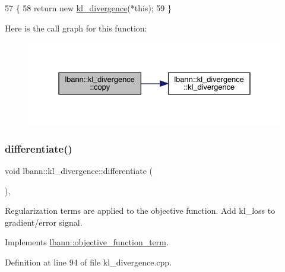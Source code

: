 \begin{DoxyCode}
57                                        \{
58     \textcolor{keywordflow}{return} \textcolor{keyword}{new} \hyperlink{classlbann_1_1kl__divergence_a3084d98e61853086a207a3893421e4d9}{kl\_divergence}(*\textcolor{keyword}{this});
59   \} 
\end{DoxyCode}
Here is the call graph for this function\+:\nopagebreak
\begin{figure}[H]
\begin{center}
\leavevmode
\includegraphics[width=331pt]{classlbann_1_1kl__divergence_aa0265eb9f1cff77d4101137b09f87353_cgraph}
\end{center}
\end{figure}
\mbox{\label{classlbann_1_1kl__divergence_aeb39d1ba1e74874cbf396fbe137ff601}} 
\subsubsection{\texorpdfstring{differentiate()}{differentiate()}}
{\footnotesize\ttfamily void lbann\+::kl\+\_\+divergence\+::differentiate (\begin{DoxyParamCaption}{ }\end{DoxyParamCaption})\hspace{0.3cm}{\ttfamily [override]}, {\ttfamily [virtual]}}

Regularization terms are applied to the objective function. Add kl\+\_\+loss to gradient/error signal. 

Implements \hyperlink{classlbann_1_1objective__function__term_ad009c3cfbe1cf2fbb6cce015b16fdac5}{lbann\+::objective\+\_\+function\+\_\+term}.



Definition at line 94 of file kl\+\_\+divergence.\+cpp.


